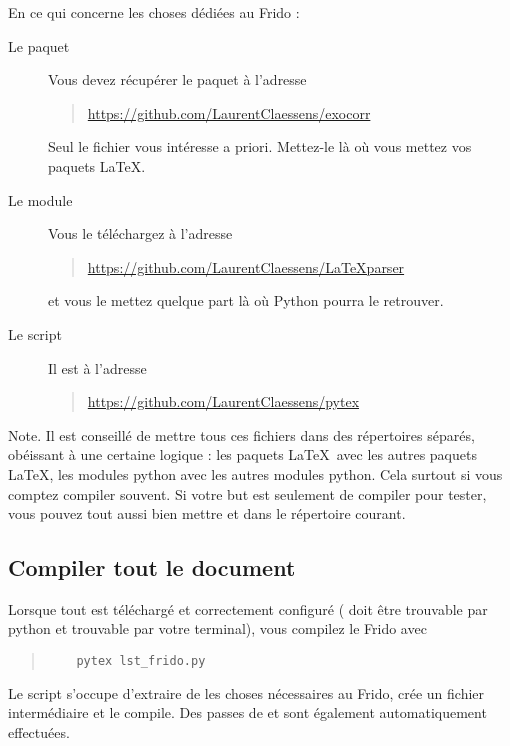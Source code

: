 En ce qui concerne les choses dédiées au Frido :
\begin{description}
    \item[Le paquet ]
        Vous devez récupérer le paquet  à l'adresse
        \begin{quote}
            \url{https://github.com/LaurentClaessens/exocorr}
        \end{quote}
        Seul le fichier  vous intéresse a priori. Mettez-le là où vous mettez vos paquets \LaTeX.
    \item[Le module ]
        Vous le téléchargez à l'adresse
        \begin{quote}
            \url{https://github.com/LaurentClaessens/LaTeXparser}
        \end{quote}
        et vous le mettez quelque part là où Python pourra le retrouver.
    \item[Le script ]
        Il est à l'adresse
        \begin{quote}
            \url{https://github.com/LaurentClaessens/pytex}
        \end{quote}
\end{description}

Note. Il est conseillé de mettre tous ces fichiers dans des répertoires séparés, obéissant à une certaine logique : les paquets \LaTeX\ avec les autres paquets \LaTeX, les modules python avec les autres modules python. Cela surtout si vous comptez compiler souvent. Si votre but est seulement de compiler pour tester, vous pouvez tout aussi bien mettre  et  dans le répertoire courant.

\subsection{Compiler tout le document}

Lorsque tout est téléchargé et correctement configuré ( doit être trouvable par python et  trouvable par votre terminal), vous compilez le Frido avec
\begin{quote}
    \begin{verbatim}
    pytex lst_frido.py
    \end{verbatim}
\end{quote}
Le script s'occupe d'extraire de  les choses nécessaires au Frido, crée un fichier intermédiaire et le compile. Des passes de  et  sont également automatiquement effectuées.

